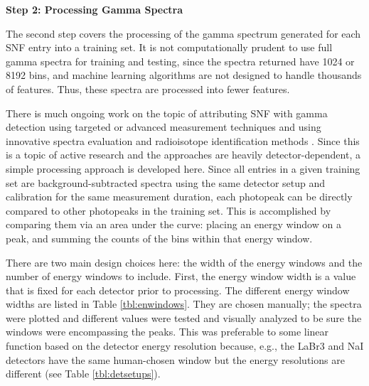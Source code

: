 \noindent \textbf{Step 2: Processing Gamma Spectra}

The second step covers the processing of the gamma spectrum generated for each
\gls{SNF} entry into a training set.  It is not computationally prudent to use
full gamma spectra for training and testing, since the spectra returned have
1024 or 8192 bins, and machine learning algorithms are not designed to handle
thousands of features.  Thus, these spectra are processed into fewer features.

There is much ongoing work on the topic of attributing \gls{SNF} with gamma
detection using targeted or advanced measurement techniques \cite{snf_gamma,
compton_supp, bwr_high-res_gamma, pwr_bwr_gamma} and using innovative spectra
evaluation and radioisotope identification methods \cite{riid_09,
rapid_riid_18, sull_gen_07, sull_valid_15, sull_auto_17, sull_unc_17}.   Since
this is a topic of active research and the approaches are heavily
detector-dependent, a simple processing approach is developed here.  Since all
entries in a given training set are background-subtracted spectra using the
same detector setup and calibration for the same measurement duration, each
photopeak can be directly compared to other photopeaks in the training set.
This is accomplished by comparing them via an area under the curve: placing an
energy window on a peak, and summing the counts of the bins within that energy
window. 

There are two main design choices here: the width of the energy windows and the
number of energy windows to include. First, the energy window width is a value
that is fixed for each detector prior to processing.  The different energy
window widths are listed in Table \ref{tbl:enwindows}.  They are chosen
manually; the spectra were plotted and different values were tested and
visually analyzed to be sure the windows were encompassing the peaks. This was
preferable to some linear function based on the detector energy resolution
because, e.g., the \gls{LaBr3} and \gls{NaI} detectors have the same
human-chosen window but the energy resolutions are different (see Table
\ref{tbl:detsetups}). 

